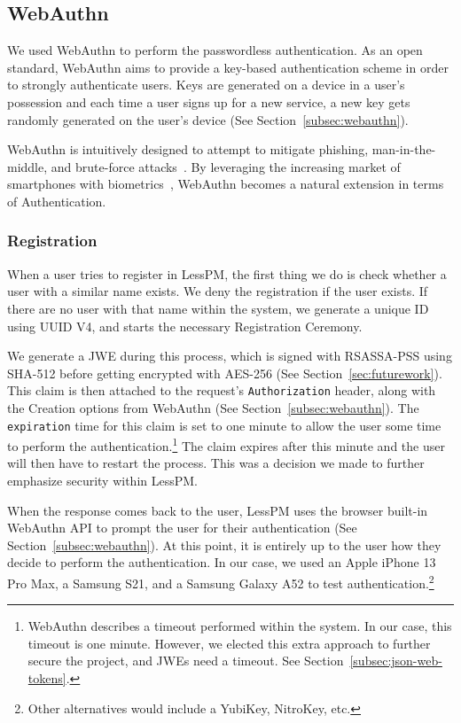 \subsection{WebAuthn}\label{subsec:webauthn-methodology}
We used WebAuthn to perform the passwordless authentication.
As an open standard, WebAuthn aims to provide a key-based authentication
scheme in order to strongly authenticate users.
Keys are generated on a device in a user's possession and each time a
user signs up for a new service, a new key gets randomly generated on the
user's device (See Section~\ref{subsec:webauthn}).

WebAuthn is intuitively designed to attempt to mitigate phishing,
man-in-the-middle, and brute-force attacks~\cite{webauthn_level_2}.
By leveraging the increasing market of smartphones with
biometrics~\cite{statista-biometric-transactions}, WebAuthn becomes a natural
extension in terms of Authentication.

\subsubsection{Registration}
When a user tries to register in LessPM, the first thing we do is check
whether a user with a similar name exists.
We deny the registration if the user exists.
If there are no user with that name within the system, we generate a unique ID
using UUID V4, and starts the necessary Registration Ceremony.

We generate a JWE during this process, which is signed with RSASSA-PSS
using SHA-512 before getting encrypted with AES-256 (See
Section~\ref{sec:futurework}).
This claim is then attached to the request's \texttt{Authorization} header,
along with the Creation options from WebAuthn (See
Section~\ref{subsec:webauthn}).
The \texttt{expiration} time for this claim is set to one minute to allow the
user some time to perform the authentication.\footnote{
  WebAuthn describes a timeout performed within the system. In our case, this
  timeout is one minute.
  However, we elected this extra approach to further secure the project, and
  JWEs need a timeout. See Section~\ref{subsec:json-web-tokens}.
}
The claim expires after this minute and the user will then have to restart the
process.
This was a decision we made to further emphasize security within LessPM\@.

When the response comes back to the user, LessPM uses the browser built-in
WebAuthn API to prompt the user for their authentication (See
Section~\ref{subsec:webauthn}).
At this point, it is entirely up to the user how they decide to perform the
authentication.
In our case, we used an Apple iPhone 13 Pro Max, a Samsung S21, and a Samsung
Galaxy A52 to test authentication.\footnote{
  Other alternatives would include a YubiKey, NitroKey, etc.
}

